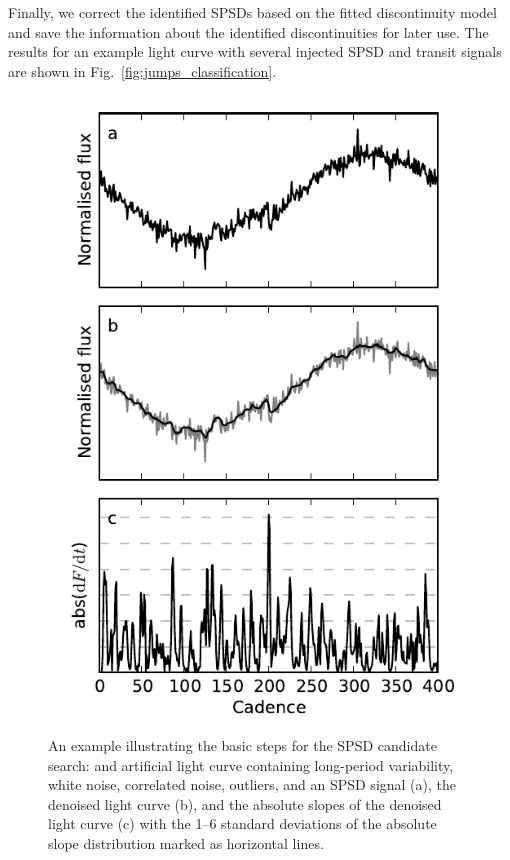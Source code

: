 \documentclass[useAMS,usenatbib]{mn2e}
\begin{document}
Finally, we correct the identified SPSDs based on the fitted discontinuity model and
save the information about the identified discontinuities for later use. The results
for an example light curve with several injected SPSD and transit signals are shown 
in Fig.~\ref{fig:jumps_classification}.

\begin{figure}
 \centering
 \includegraphics[width=\columnwidth]{jumps_identification.pdf}
 \caption{An example illustrating the basic steps for the SPSD candidate search: 
  and artificial light curve containing long-period variability, white noise,
  correlated noise, outliers, and an SPSD signal (a),
  the denoised light curve (b), and the absolute slopes of the denoised light
  curve (c) with the 1--6 standard deviations of the absolute slope distribution 
  marked as horizontal lines.}
 \label{fig:jumps_identification}
\end{figure}
\end{document}
